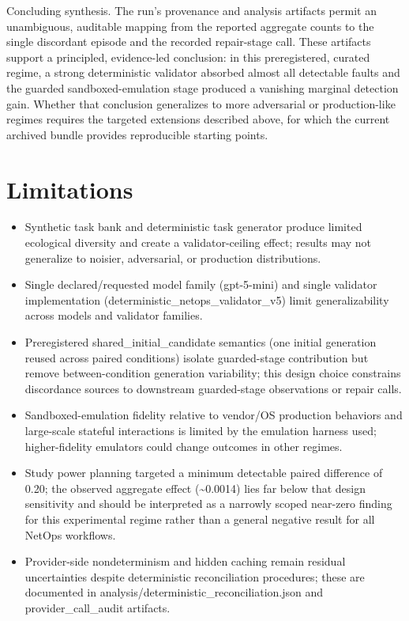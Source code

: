 \documentclass[conference]{IEEEtran}
\begin{document}
Concluding synthesis. The run's provenance and analysis artifacts permit an unambiguous, auditable mapping from the reported aggregate counts to the single discordant episode and the recorded repair-stage call. These artifacts support a principled, evidence-led conclusion: in this preregistered, curated regime, a strong deterministic validator absorbed almost all detectable faults and the guarded sandboxed-emulation stage produced a vanishing marginal detection gain. Whether that conclusion generalizes to more adversarial or production-like regimes requires the targeted extensions described above, for which the current archived bundle provides reproducible starting points.

\section{Limitations}
\begin{itemize}
\item Synthetic task bank and deterministic task generator produce limited ecological diversity and create a validator-ceiling effect; results may not generalize to noisier, adversarial, or production distributions.
\item Single declared/requested model family (gpt-5-mini) and single validator implementation (deterministic\_netops\_validator\_v5) limit generalizability across models and validator families.
\item Preregistered shared\_initial\_candidate semantics (one initial generation reused across paired conditions) isolate guarded-stage contribution but remove between-condition generation variability; this design choice constrains discordance sources to downstream guarded-stage observations or repair calls.
\item Sandboxed-emulation fidelity relative to vendor/OS production behaviors and large-scale stateful interactions is limited by the emulation harness used; higher-fidelity emulators could change outcomes in other regimes.
\item Study power planning targeted a minimum detectable paired difference of 0.20; the observed aggregate effect (\textasciitilde{}0.0014) lies far below that design sensitivity and should be interpreted as a narrowly scoped near-zero finding for this experimental regime rather than a general negative result for all NetOps workflows.
\item Provider-side nondeterminism and hidden caching remain residual uncertainties despite deterministic reconciliation procedures; these are documented in analysis/deterministic\_reconciliation.json and provider\_call\_audit artifacts.
\end{itemize}
\end{document}
